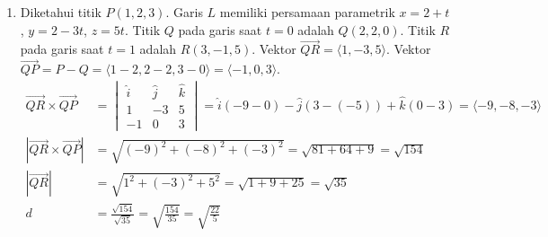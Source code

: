 \documentclass[11pt,letterpaper]{article}
\begin{document}
\begin{enumerate}
\begin{enumerate}[label=\alph*.]
\begin{center}
                \end{center}
                Luas jajargenjang yang dibentuk oleh $\vec{QR}$ dan $\vec{QP}$ besarnya adalah $|\vec{QR} \times \vec{QP}|$. Karena Luas $=$ alas $\times$ tinggi $= |\vec{QR}| \cdot d$, maka diperoleh:
                \[ d = \frac{|\vec{QR} \times \vec{QP}|}{|\vec{QR}|} \]
          \item Diketahui titik $P(1, 2, 3)$. Garis $L$ memiliki persamaan parametrik $x = 2+t$, $y = 2-3t$, $z = 5t$.
                Titik $Q$ pada garis saat $t=0$ adalah $Q(2, 2, 0)$.
                Titik $R$ pada garis saat $t=1$ adalah $R(3, -1, 5)$.
                Vektor $\vec{QR} = \langle 1, -3, 5 \rangle$.
                Vektor $\vec{QP} = P - Q = \langle 1-2, 2-2, 3-0 \rangle = \langle -1, 0, 3 \rangle$.
                \begin{align*}
                  \vec{QR} \times \vec{QP}   & = \begin{vmatrix} \hat{i} & \hat{j} & \hat{k} \\ 1 & -3 & 5 \\ -1 & 0 & 3 \end{vmatrix} = \hat{i}(-9 - 0) - \hat{j}(3 - (-5)) + \hat{k}(0 - 3) = \langle -9, -8, -3 \rangle \\
                  |\vec{QR} \times \vec{QP}| & = \sqrt{(-9)^2 + (-8)^2 + (-3)^2} = \sqrt{81 + 64 + 9} = \sqrt{154}                                                                                                         \\
                  |\vec{QR}|                 & = \sqrt{1^2 + (-3)^2 + 5^2} = \sqrt{1 + 9 + 25} = \sqrt{35}                                                                                                                 \\
                  d                          & = \frac{\sqrt{154}}{\sqrt{35}} = \sqrt{\frac{154}{35}} = \sqrt{\frac{22}{5}}
                \end{align*}
        \end{enumerate}


\end{enumerate}
\end{document}
